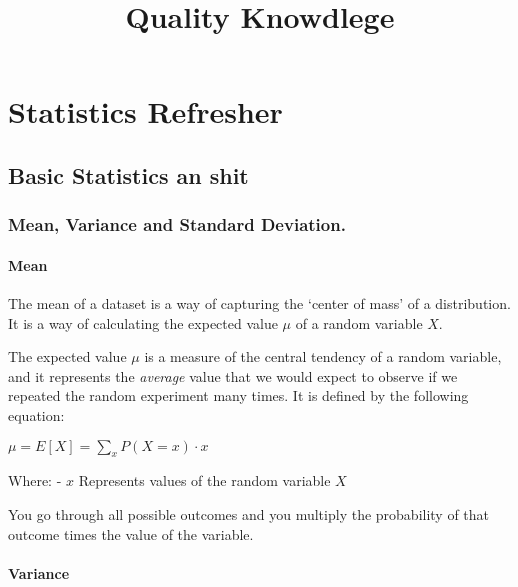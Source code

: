 \documentclass[11pt]{article}
\title{Quality Knowdlege}
\begin{document}
    
    \maketitle
    
    

    
    \hypertarget{statistics-refresher}{%
\section{Statistics Refresher}\label{statistics-refresher}}

    \hypertarget{basic-statistics-an-shit}{%
\subsection{Basic Statistics an shit}\label{basic-statistics-an-shit}}

    \hypertarget{mean-variance-and-standard-deviation.}{%
\subsubsection{Mean, Variance and Standard
Deviation.}\label{mean-variance-and-standard-deviation.}}

\hypertarget{mean}{%
\paragraph{Mean}\label{mean}}

The mean of a dataset is a way of capturing the `center of mass' of a
distribution. It is a way of calculating the expected value \(\mu\) of a
random variable \(X\).

The expected value \(\mu\) is a measure of the central tendency of a
random variable, and it represents the \emph{average} value that we
would expect to observe if we repeated the random experiment many times.
It is defined by the following equation:

\(\mu = E[X] = \sum_{x} P(X = x) \cdot x\)

Where: - \(x\) Represents values of the random variable \(X\)

You go through all possible outcomes and you multiply the probability of
that outcome times the value of the variable.



\hypertarget{variance}{%
\paragraph{Variance}\label{variance}}
\end{document}
